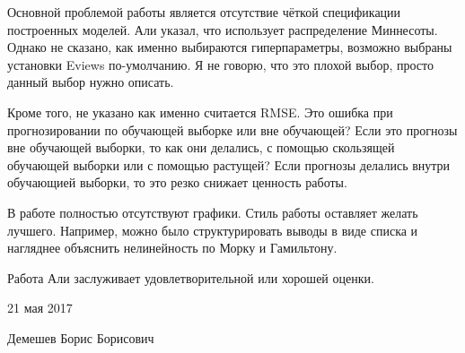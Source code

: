 \documentclass[a4paper, 12pt]{article}
\begin{document}
Основной проблемой работы является отсутствие чёткой спецификации
построенных моделей. Али указал, что использует распределение Миннесоты.
Однако не сказано, как именно выбираются гиперпараметры, возможно
выбраны установки Eviews по-умолчанию. Я не говорю, что это плохой
выбор, просто данный выбор нужно описать.

Кроме того, не указано как именно считается RMSE. Это ошибка при
прогнозировании по обучающей выборке или вне обучающей? Если это
прогнозы вне обучающей выборки, то как они делались, с помощью
скользящей обучающей выборки или с помощью растущей? Если прогнозы
делались внутри обучающией выборки, то это резко снижает ценность
работы.

В работе полностью отсутствуют графики. Стиль работы оставляет желать
лучшего. Например, можно было структурировать выводы в виде списка и
нагляднее объяснить нелинейность по Морку и Гамильтону.

Работа Али заслуживает удовлетворительной или хорошей оценки.

\vspace{0.4cm}

21 мая 2017

Демешев Борис Борисович
\end{document}
